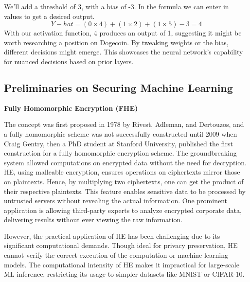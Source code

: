 \documentclass[conference]{IEEEtran}
\begin{document}
We’ll add a threshold of 3, with a bias of -3.  In the formula we can enter in values to get a desired output.
$$
Y-hat = (0\times4) + (1\times2) + (1\times5) - 3 = 4
$$
With our activation function, 4 produces an output of 1, suggesting it might be worth researching a position on Dogecoin. By tweaking weights or the bias, different decisions might emerge. This showcases the neural network's capability for nuanced decisions based on prior layers.

\subsection{Preliminaries on Securing Machine Learning}
\noindent \textbf{Fully Homomorphic Encryption (FHE)}

The concept was first proposed in 1978 by Rivest, Adleman, and Dertouzos, and a fully homomorphic scheme was not successfully constructed until 2009 when Craig Gentry, then a PhD student at Stanford University, published the first construction for a fully homomorphic encryption scheme. The groundbreaking system allowed computations on encrypted data without the need for decryption. HE, using malleable encryption, ensures operations on ciphertexts mirror those on plaintexts. Hence, by multiplying two ciphertexts, one can get the product of their respective plaintexts. This feature enables sensitive data to be processed by untrusted servers without revealing the actual information. One prominent application is allowing third-party experts to analyze encrypted corporate data, delivering results without ever viewing the raw information.

However, the practical application of HE has been challenging due to its significant computational demands. Though ideal for privacy preservation, HE cannot verify the correct execution of the computation or machine learning models. The computational intensity of HE makes it impractical for large-scale ML inference, restricting its usage to simpler datasets like MNIST or CIFAR-10. 
\end{document}
